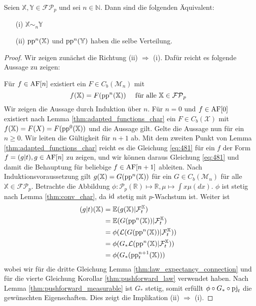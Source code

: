     \begin{lemma}\label{thm:equivalence_adapted_pp}
        Seien $\mathbb{X,Y} \in \mathcal{FP}_p$ und sei $n \in \mathbb{N}$. Dann sind die folgenden Äquivalent:
        \begin{enumerate}
            \item[(i)] $\mathbb{X} \sim_n \mathbb{Y}$
            \item[(ii)] $\operatorname{pp}^n(\mathbb{X})$ und $\operatorname{pp}^n(\mathbb{Y})$ haben die selbe Verteilung.
        \end{enumerate}
    \end{lemma}
    \begin{proof}
        Wir zeigen zunächst die Richtung (ii) $\Rightarrow$ (i). Dafür reicht es folgende Aussage zu zeigen:

        Für $f \in \operatorname{AF}[n]$ existiert ein $F \in C_b(\mathcal{M}_n)$ mit 
        \begin{equation}\label{eq:481}
            f(\mathbb{X}) = F(\operatorname{pp}^n(\mathbb{X})) \quad \text{ für alle } \mathbb{X} \in \mathcal{FP}_p
        \end{equation}
        Wir zeigen die Aussage durch Induktion über $n$. Für $n=0$ und $f \in \operatorname{AF}[0]$ existiert nach Lemma \ref{thm:adapted_functions_char} ein $F \in C_b(\mathcal{X})$ mit $f(\mathbb{X})=F(X)=F(\operatorname{pp}^0(\mathbb{X}))$ und die Aussage gilt. Gelte die Aussage nun für ein $n\geq 0$. Wir leiten die Gültigkeit für $n+1$ ab. Mit dem zweiten Punkt von Lemma \ref{thm:adapted_functions_char} reicht es die Gleichung \ref{eq:481} für ein $f$ der Form $f=(g\vert t), g\in \operatorname{AF}[n]$ zu zeigen, und wir können daraus Gleichung \ref{eq:481} und damit die Behauptung für beliebige $f \in \operatorname{AF}[n+1]$ ableiten. Nach Induktionsvoraussetzung gilt $g(\mathbb{X}) = G(\operatorname{pp}^n(\mathbb{X}))$ für ein $G \in C_b(\mathcal{M}_n)$ für alle $\mathbb{X}\in\mathcal{FP}_p$. Betrachte die Abbildung $\phi: \mathcal{P}_p(\mathbb{R}) \mapsto \mathbb{R}, \mu \mapsto \int x\mu(dx)$. $\phi$ ist stetig nach Lemma \ref{thm:conv_char}, da $\operatorname{id}$ stetig mit $p$-Wachstum ist. Weiter ist 
        \begin{align*}
            (g\vert t)(\mathbb{X}) &= \mathbb{E}(g(\mathbb{X}) \vert \mathcal{F}_t^\mathbb{X}) \\
            &= \mathbb{E}(G(\operatorname{pp}^n(\mathbb{X})) \vert \mathcal{F}_t^\mathbb{X}) \\
            &= \phi(\mathcal{L}(G(\operatorname{pp}^n(\mathbb{X})) \vert \mathcal{F}_t^\mathbb{X})) \\
            &= \phi(G_*\mathcal{L}(\operatorname{pp}^n(\mathbb{X}) \vert \mathcal{F}_t^\mathbb{X})) \\
            &= \phi(G_*(\operatorname{pp}^{n+1}_t(\mathbb{X})))
        \end{align*}
        wobei wir für die dritte Gleichung Lemma \ref{thm:law_expectancy_connection} und für die vierte Gleichung Korollar \ref{thm:pushforward_law} verwendet haben. Nach Lemma \ref{thm:pushforward_measurable} ist $G_*$ stetig, somit erfüllt $\phi\circ G_*\circ \operatorname{pj}_t$ die gewünschten Eigenschaften. Dies zeigt die Implikation (ii) $\Rightarrow$ (i).


\end{proof}
